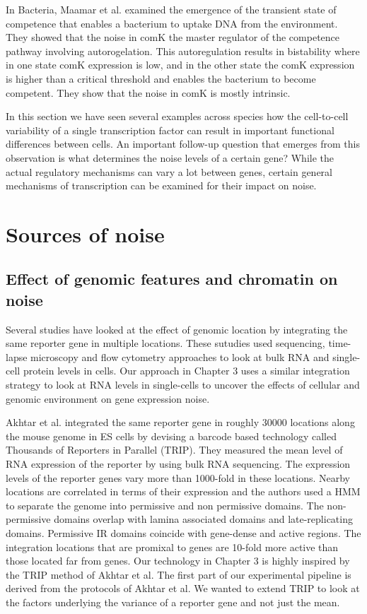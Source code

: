 In Bacteria, Maamar et al. \cite{Maamar} examined the emergence of the transient state of competence that enables a bacterium to uptake DNA from the environment. They showed that the noise in comK the master regulator of the competence pathway involving autorogelation. This autoregulation results in bistability where in one state comK expression is low, and in the other state the comK expression is higher than a critical threshold and enables the bacterium to become competent. They show that the noise in comK is mostly intrinsic.

In this section we have seen several examples across species how the cell-to-cell variability of a single transcription factor can result in important functional differences between cells. An important follow-up question that emerges from this observation is what determines the noise levels of a certain gene? While the actual regulatory mechanisms can vary a lot between genes, certain general mechanisms of transcription can be examined for their impact on noise.

\section{Sources of noise}

\subsection{Effect of genomic features and chromatin on noise}

Several studies have looked at the effect of genomic location by integrating the same reporter gene in multiple locations. These sutudies used sequencing, time-lapse microscopy and flow cytometry approaches to look at bulk RNA and single-cell protein levels in cells. Our approach in Chapter 3 uses a similar integration strategy to look at RNA levels in single-cells to uncover the effects of cellular and genomic environment on gene expression noise.

Akhtar et al. \cite {Akhtar} integrated the same reporter gene in roughly 30000 locations along the mouse genome in ES cells by devising a barcode based technology called Thousands of Reporters in Parallel (TRIP). They measured the mean level of RNA expression of the reporter by using bulk RNA sequencing. The expression levels of the reporter genes vary more than 1000-fold in these locations. Nearby locations are correlated in terms of their expression and the authors used a HMM to separate the genome into permissive and non permissive domains. The non-permissive domains overlap with lamina associated domains and late-replicating domains. Permissive IR domains coincide with gene-dense and active regions. The integration locations that are promixal to genes are 10-fold more active than those located far from genes. Our technology in Chapter 3 is highly inspired by the TRIP method of Akhtar et al. The first part of our experimental pipeline is derived from the protocols of Akhtar et al. We wanted to extend TRIP to look at the factors underlying the variance of a reporter gene and not just the mean.

